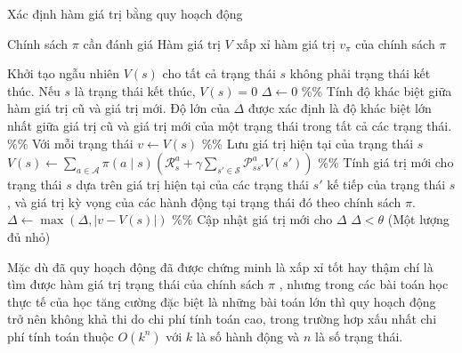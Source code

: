 \begin{algorithm}
	\caption{Xác định hàm giá trị bằng quy hoạch động}
	\label{alg_DP}
	\begin{algorithmic}[1]
		\renewcommand{\algorithmicrequire}{\textbf{Đầu vào:}}
		\renewcommand{\algorithmicensure}{\textbf{Đầu ra:}}
		\algnewcommand{}
		\algnewcommand\Operation{\item[\algorithmicoperation]}
		
		\Require Chính sách $\pi$ cần đánh giá
		\Ensure Hàm giá trị $V$ xấp xỉ hàm giá trị $v_{\pi}$ của chính sách $\pi$
		
		\Operation
		\State Khởi tạo ngẫu nhiên $V(s)$ cho tất cả trạng thái $s$ không phải trạng thái kết thúc. Nếu $s$ là trạng thái kết thúc, $V(s) = 0$
		\Repeat
		\State $\Delta \leftarrow 0$ \%\% Tính độ khác biệt giữa hàm giá trị cũ và giá trị mới. Độ lớn của $\Delta$ được xác định là độ khác biệt lớn nhất giữa giá trị cũ và giá trị mới của một trạng thái trong tất cả các trạng thái.
		 \%\% Với mỗi trạng thái
		\State $v \leftarrow  V(s)$ \%\% Lưu giá trị hiện tại của trạng thái $s$
		\State $V(s) \leftarrow \sum_{a \in \mathcal{A}}^{}\pi(a \mid s)(\mathcal{R}_{s}^{a} + \gamma \sum_{s' \in \mathcal{S}}^{}\mathcal{P}_{ss'}^{a}V(s'))$ \%\% Tính giá trị mới cho trạng thái $s$ dựa trên giá trị hiện tại của các trạng thái $s'$ kế tiếp của trạng thái $s$, và giá trị kỳ vọng của các hành động tại trạng thái đó theo chính sách $\pi$.
		\State $\Delta \leftarrow \max(\Delta, \left |v - V(s) \right |)$ \%\% Cập nhật giá trị mới cho $\Delta$
		\EndFor
		\Until $\Delta < \theta$ (Một lượng đủ nhỏ) 
	\end{algorithmic}
\end{algorithm}

Mặc dù đã quy hoạch động đã được chứng minh là xấp xỉ tốt hay thậm chí là tìm được hàm giá trị trạng thái của chính sách $\pi$ \cite{gordon1995stable}, nhưng trong các bài toán học thực tế của học tăng cường đặc biệt là những bài toán lớn thì quy hoạch động trở nên không khả thi do chi phí tính toán cao, trong trường hơp xấu nhất chi phí tính toán thuộc $O(k^{n})$ với $k$ là số hành động và $n$ là số trạng thái.

